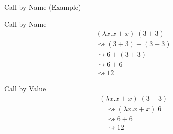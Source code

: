 \documentclass[10pt]{beamer}
\newcommand{\lam}[2]{\lambda #1 . #2}
\newcommand{\app}[2]{#1 \; #2}
\begin{document}
\begin{frame}[fragile]{Call by Name (Example)}
  \begin{exampleblock}{Call by Name}
    \begin{align*}
       & \app{(\lam{x}{x+x})}{(3+3)}    \\
       & \rightsquigarrow (3+3) + (3+3) \\
       & \rightsquigarrow 6 + (3+3)     \\
       & \rightsquigarrow 6 + 6         \\
       & \rightsquigarrow 12
    \end{align*}

    \pause

  \end{exampleblock}

  \begin{exampleblock}{Call by Value}
    \begin{align*}
       & \app{(\lam{x}{x+x})}{(3+3)}                    \\
       & \quad \rightsquigarrow \app{(\lam{x}{x+x})}{6} \\
       & \quad \rightsquigarrow 6 + 6                   \\
       & \quad \rightsquigarrow 12
    \end{align*}
  \end{exampleblock}

\end{frame}
\end{document}

